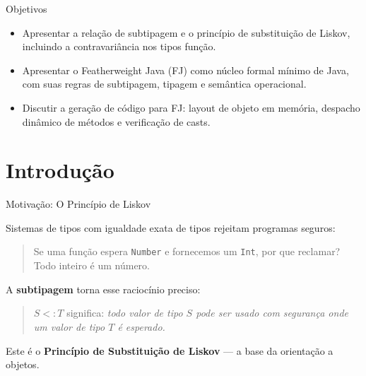 \subtitle{\bf Aula 22 - Introdução}
\begin{frame}[t,plain]
    \titlepage
\end{frame}

\begin{frame}{Objetivos}

    \begin{itemize}
        \item
        Apresentar a relação de subtipagem e o princípio de substituição de
        Liskov, incluindo a contravariância nos tipos função.
        \item
        Apresentar o Featherweight Java (FJ) como núcleo formal mínimo de
        Java, com suas regras de subtipagem, tipagem e semântica operacional.
        \item
        Discutir a geração de código para FJ: layout de objeto em memória,
        despacho dinâmico de métodos e verificação de casts.
    \end{itemize}
\end{frame}


\section{Introdução}\label{introduuxe7uxe3o}

\begin{frame}[fragile]{Motivação: O Princípio de Liskov}

    Sistemas de tipos com igualdade exata de tipos rejeitam programas
    seguros:

    \begin{quote}
        Se uma função espera \texttt{Number} e fornecemos um
        \texttt{Int}, por que reclamar? Todo inteiro é um
        número.
    \end{quote}

    A \textbf{subtipagem} torna esse raciocínio preciso:

    \begin{quote}
        \(S <: T\) significa: \emph{todo valor de tipo \(S\) pode ser usado com
        segurança onde um valor de tipo \(T\) é esperado.}
    \end{quote}

    Este é o \textbf{Princípio de Substituição de Liskov} --- a base da
    orientação a objetos.
\end{frame}

